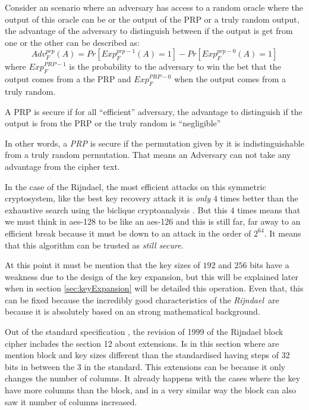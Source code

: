 \documentclass[10pt,a4paper,twoside]{llncs}
\newcommand{\rijndael}{\emph{Rijndael}}
\begin{document}
Consider an scenario where an adversary has access to a random oracle where the output of this oracle can be or the output of the PRP or a truly random output, the advantage of the adversary to distinguish between if the output is get from one or the other can be described as:
\begin{equation}\label{eq:prpAdv}
 {Adv}_{F}^{prp}(A) = Pr[{Exp}_{F}^{prp-1}(A)=1]-Pr[{Exp}_{F}^{prp-0}(A)=1]
\end{equation}
where ${Exp}_{F}^{PRP-1}$ is the probability to the adversary to win the bet that the output comes from a the PRP and ${Exp}_{F}^{PRP-0}$ when the output comes from a truly random.

\begin{definition}\label{def:securePRP}
 A PRP is secure if for all ``efficient'' adversary, the advantage to distinguish if the output is from the PRP or the truly random is ``negligible''
\end{definition}

In other words, a \emph{PRP} is secure if the permutation given by it is indistinguishable from a truly random permutation. That means an Adversary can not take any advantage from the cipher text.

In the case of the Rijndael, the most efficient attacks on this symmetric cryptosystem, like the best key recovery attack it is \emph{only} $4$ times better than the exhaustive search using the biclique cryptoanalysis \cite{biclique-fullaes}. But this $4$ times means that we must think in aes-128 to be like an aes-126 and this is still far, far away to an efficient break because it must be down to an attack in the order of $2^{64}$. It means that this algorithm can be trusted as \emph{still secure}.

At this point it must be mention that the key sizes of $192$ and $256$ bits have a weakness due to the design of the key expansion, but this will be explained later when in section \ref{sec:keyExpansion} will be detailed this operation. Even that, this can be fixed because the incredibly good characteristics of the \rijndael\, are because it is absolutely based on an strong mathematical background.

Out of the standard specification \cite{AES-FIPS}, the revision of 1999 of the Rijndael block cipher \cite{Daemen01aes-ammended} includes the section 12 about extensions. Is in this section where are mention block and key sizes different than the standardised having steps of 32 bits in between the 3 in the standard. This extensions can be because it only changes the number of columns. It already happens with the cases where the key have more columns than the block, and in a very similar way the block can also saw it number of columns increased.
\end{document}
